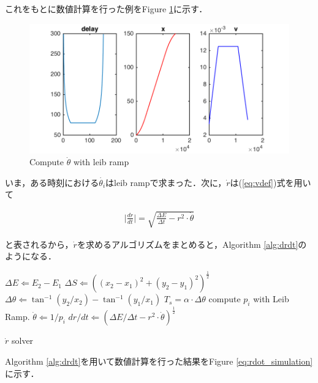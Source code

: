 \documentclass[twocolumn,oneside,a4paper]{article}
\begin{document}
これをもとに数値計算を行った例をFigure \ref{fig:leib_ramp_result}に示す．

\begin{figure}[h]
    \includegraphics[bb=0 0 432 216,width=1\columnwidth]{leib_ramp_screenshot.png}
    \caption{Compute $\dot{\theta}$ with leib ramp}
    \label{fig:leib_ramp_result}
\end{figure}

いま，ある時刻における$\dot{\theta_i}$はleib rampで求まった．次に，$\dot r$は(\ref{eq:vdef})式を用いて

\begin{eqnarray}
     \bigg|\frac{dr}{dt}\bigg| = \sqrt{\frac{\Delta E}{\Delta t} - r^2 \cdot \dot \theta}
\end{eqnarray}

と表されるから，$\dot r$を求めるアルゴリズムをまとめると，Algorithm \ref{alg:drdt}のようになる．

\begin{algorithm}[h]                 
\begin{algorithmic}                 
\label{alg:drdt}                         
\STATE $\Delta E \Leftarrow E_2-E_1$
\STATE $\Delta S \Leftarrow ((x_2-x_1)^2 + (y_2-y_1)^2)^{\frac{1}{2}}$
\STATE $\Delta \theta \Leftarrow \tan^{-1} (y_2/x_2) - \tan^{-1} (y_1/x_1)$
\STATE $T_s = \alpha \cdot \Delta \theta$
\STATE compute $p_i$ with Leib Ramp.
\STATE $\dot \theta \Leftarrow 1 / p_i $
\STATE $dr/dt \Leftarrow (\Delta E/\Delta t-r^2 \cdot \dot \theta)^{\frac{1}{2}}$
\end{algorithmic}
\caption{$\dot r$ solver}
\end{algorithm}

Algorithm \ref{alg:drdt}を用いて数値計算を行った結果をFigure \ref{eq:rdot_simulation}に示す．
\end{document}

